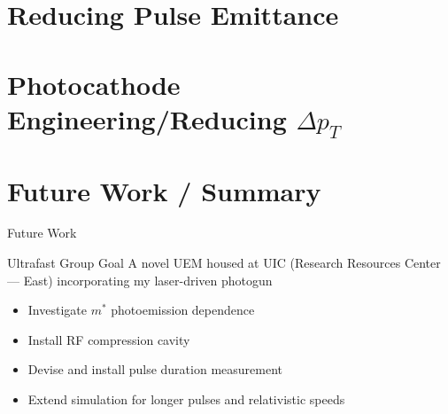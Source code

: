 \documentclass[mathserif]{beamer}
\providecommand{\smallT}[0]{ { \scriptscriptstyle T } }
\begin{document}
\section{Reducing Pulse Emittance}


\section{Photocathode Engineering/Reducing $\Delta p_{\smallT}$}


\section{Future Work / Summary}

\begin{frame}{Future Work}
  \begin{block}{Ultrafast Group Goal}
    A novel UEM housed at UIC (Research Resources Center --- East) incorporating my laser-driven photogun
  \end{block}
  \begin{itemize}
    \item<2-> Investigate $m^{*}$ photoemission dependence
    \item<3-> Install RF compression cavity
    \item<4-> Devise and install pulse duration measurement
    \item<5-> Extend simulation for longer pulses and relativistic speeds
  \end{itemize}
\end{frame}
\end{document}
